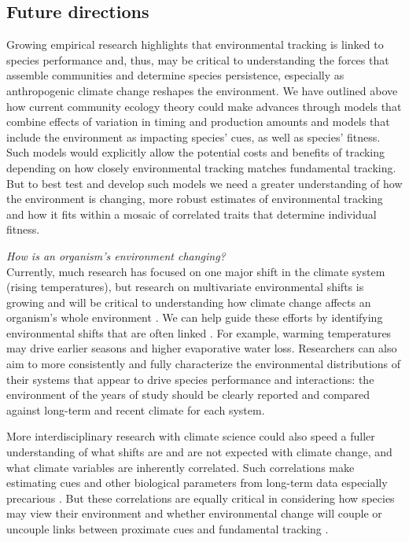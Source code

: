 \documentclass[11pt,letterpaper]{article}
\newcommand{\R}[1]{\label{}\linelabel{#1}} %
\begin{document}
\subsection{Future directions}

Growing empirical research highlights that environmental tracking is linked to species performance and, thus, may be critical to understanding the forces that assemble communities and determine species persistence, especially as anthropogenic climate change reshapes the environment. We have outlined above how  current community ecology theory could make advances through models that combine effects of variation in timing and production amounts and models that include the environment as impacting species' cues, as well as species' fitness. Such models would explicitly allow the potential costs and benefits of tracking  depending on how closely environmental tracking matches fundamental tracking. But to best test and develop such models we need a greater understanding of how the environment is changing, more robust estimates of environmental tracking and how it fits within a mosaic of correlated traits that determine individual fitness. 

\emph{How is an organism's environment changing?} \\ 
Currently, much research has focused on one major shift in the climate system (rising temperatures), but research on multivariate environmental shifts is growing and will be critical to understanding how climate change affects an organism's whole environment \citep[e.g.,][]{chevin2015}.\R{citechevin2015} We can help guide these efforts by identifying environmental shifts that are often linked \citep[e.g.,][]{wadgymar2018}. \R{r3misc5}For example, warming temperatures may drive earlier seasons and higher evaporative water loss. Researchers can also aim to more consistently and fully characterize the environmental distributions of their systems that appear to drive species performance and interactions: the environment of the years of study should be clearly reported and compared against long-term and recent climate for each system. 

More interdisciplinary research with climate science could also speed a fuller understanding of what shifts are and are not expected with climate change, and what climate variables are inherently correlated. Such correlations make estimating cues and other biological parameters from long-term data especially precarious \citep{tansey2017}. But these correlations are equally critical in considering how species may view their environment and whether environmental change will couple or uncouple links between proximate cues and fundamental tracking \citep{bonamour2019}. \\
\end{document}
